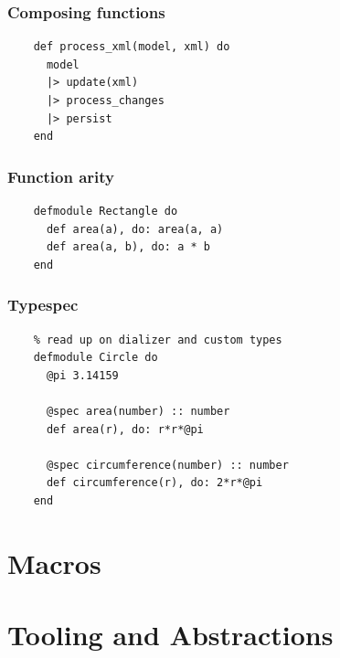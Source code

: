 \documentclass{beamer}
\begin{document}
\begin{frame}[fragile]
  \frametitle{Composing functions}
  \begin{lstlisting}
    def process_xml(model, xml) do
      model
      |> update(xml)
      |> process_changes
      |> persist
    end
  \end{lstlisting}
\end{frame}

\begin{frame}[fragile]
  \frametitle{Function arity}
  \begin{lstlisting}
    defmodule Rectangle do
      def area(a), do: area(a, a)
      def area(a, b), do: a * b
    end
  \end{lstlisting}
\end{frame}

\begin{frame}[fragile]
  \frametitle{Typespec}
  \begin{lstlisting}
    % read up on dializer and custom types
    defmodule Circle do
      @pi 3.14159

      @spec area(number) :: number
      def area(r), do: r*r*@pi
        
      @spec circumference(number) :: number
      def circumference(r), do: 2*r*@pi
    end
  \end{lstlisting}
\end{frame}

\section[Section]{Macros}

\section[Section]{Tooling and Abstractions}
  
\end{document}
